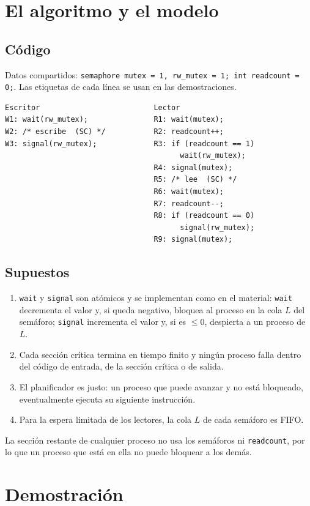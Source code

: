 \documentclass[12pt,letterpaper]{article}
\theoremstyle{definition}
\newcommand{\sem}[1]{\texttt{#1}}
\begin{document}
\section{El algoritmo y el modelo}
\subsection{Código}
Datos compartidos: \sem{semaphore mutex = 1, rw\_mutex = 1; int readcount = 0;}. Las etiquetas de cada línea se usan en las demostraciones.
\begin{lstlisting}
Escritor                          Lector
W1: wait(rw_mutex);               R1: wait(mutex);
W2: /* escribe  (SC) */           R2: readcount++;
W3: signal(rw_mutex);             R3: if (readcount == 1)
                                        wait(rw_mutex);
                                  R4: signal(mutex);
                                  R5: /* lee  (SC) */
                                  R6: wait(mutex);
                                  R7: readcount--;
                                  R8: if (readcount == 0)
                                        signal(rw_mutex);
                                  R9: signal(mutex);
\end{lstlisting}

\subsection{Supuestos}
\begin{enumerate}[itemsep=2pt]
\item \sem{wait} y \sem{signal} son atómicos y se implementan como en el material: \sem{wait} decrementa el valor y, si queda negativo, bloquea al proceso en la cola $L$ del semáforo; \sem{signal} incrementa el valor y, si es $\le 0$, despierta a un proceso de $L$.
\item Cada sección crítica termina en tiempo finito y ningún proceso falla dentro del código de entrada, de la sección crítica o de salida.
\item El planificador es justo: un proceso que puede avanzar y no está bloqueado, eventualmente ejecuta su siguiente instrucción.
\item Para la espera limitada de los lectores, la cola $L$ de cada semáforo es FIFO.
\end{enumerate}
La sección restante de cualquier proceso no usa los semáforos ni \sem{readcount}, por lo que un proceso que está en ella no puede bloquear a los demás.

\section{Demostración}
\end{document}
